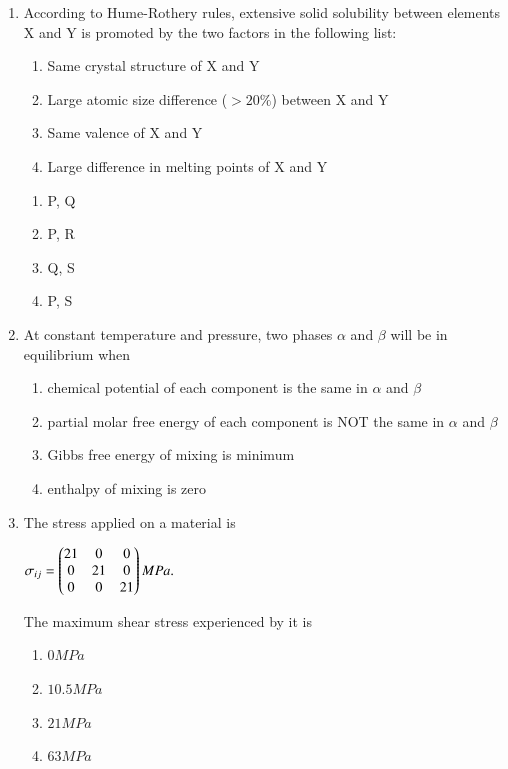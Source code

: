 \documentclass[journal]{IEEEtran}
\theoremstyle{remark}
\begin{document}
\begin{enumerate}
\item According to Hume-Rothery rules, extensive solid solubility between elements X and Y is promoted by 
the two factors in the following list:\hfill{}
\begin{enumerate}[label=\Alph*), start=16]
    \item Same crystal structure of X and Y
    \item Large atomic size difference ($>20\%$) between X and Y
    \item Same valence of X and Y
    \item Large difference in melting points of X and Y
\end{enumerate}
\begin{multicols}{4}
\begin{enumerate}
\item  P, Q
\item  P, R
\item Q, S
\item P, S
\end{enumerate}
\end{multicols}

\item At constant temperature and pressure, two phases $\alpha$ and $\beta$ will be in equilibrium when\hfill{}\\
\begin{enumerate}
\item chemical potential of each component is the same in $\alpha$  and $\beta$
\item partial molar free energy of each component is NOT the same in $\alpha$  and $\beta$
\item Gibbs free energy of mixing is minimum
\item  enthalpy of mixing is zero
\end{enumerate}

	\item  The stress applied on a material is
    \hfill{}
    
\begin{center}
$\sigma_{ij} = 
\begin{pmatrix}21 & 0 & 0 \\ 0 & 21 & 0 \\0 & 0 & 21\end{pmatrix} MPa.$\\
\end{center}
The maximum shear stress experienced by it is
\begin{multicols}{4}
\begin{enumerate}
\item  $0 MPa$
\item  $10.5 MPa$
\item  $21 MPa$
\item  $63 MPa$
\end{enumerate}
\end{multicols}


\end{enumerate}
\end{document}
